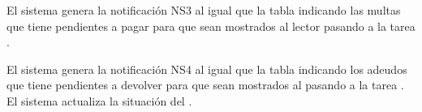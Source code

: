 \begin{PDescripcion}
\begin{enumerate}
      \Ppaso[\itarea]  El sistema genera la notificación NS3 al igual que la tabla indicando las multas que tiene pendientes a pagar para que sean mostrados al lector pasando a la tarea . 

      \Ppaso[\itarea]  El sistema genera la notificación NS4 al igual que la tabla indicando los adeudos que tiene pendientes a devolver para que sean mostrados al  pasando a la tarea .
      \Ppaso[\itarea]  El sistema actualiza la situación del .
      
      
      
          \end{enumerate}

\end{PDescripcion}


